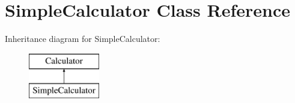 \hypertarget{class_simple_calculator}{}\section{Simple\+Calculator Class Reference}
\label{class_simple_calculator}
Inheritance diagram for Simple\+Calculator\+:\begin{figure}[H]
\begin{center}
\leavevmode
\includegraphics[height=2.000000cm]{class_simple_calculator}
\end{center}
\end{figure}
